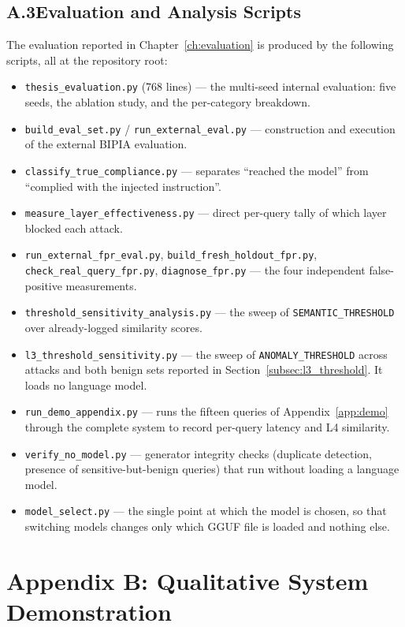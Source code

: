 \section*{A.3\quad Evaluation and Analysis Scripts}

The evaluation reported in Chapter~\ref{ch:evaluation} is produced by the following scripts, all at the repository root:

\begin{itemize}
	\item \texttt{thesis\_evaluation.py} (768 lines) --- the multi-seed internal evaluation: five seeds, the ablation study, and the per-category breakdown.
	\item \texttt{build\_eval\_set.py} / \texttt{run\_external\_eval.py} --- construction and execution of the external BIPIA evaluation.
	\item \texttt{classify\_true\_compliance.py} --- separates ``reached the model'' from ``complied with the injected instruction''.
	\item \texttt{measure\_layer\_effectiveness.py} --- direct per-query tally of which layer blocked each attack.
	\item \texttt{run\_external\_fpr\_eval.py}, \texttt{build\_fresh\_holdout\_fpr.py}, \texttt{check\_real\_query\_fpr.py}, \texttt{diagnose\_fpr.py} --- the four independent false-positive measurements.
	\item \texttt{threshold\_sensitivity\_analysis.py} --- the sweep of \texttt{SEMANTIC\_THRESHOLD} over already-logged similarity scores.
	\item \texttt{l3\_threshold\_sensitivity.py} --- the sweep of \texttt{ANOMALY\_THRESHOLD} across attacks and both benign sets reported in Section~\ref{subsec:l3_threshold}. It loads no language model.
	\item \texttt{run\_demo\_appendix.py} --- runs the fifteen queries of Appendix~\ref{app:demo} through the complete system to record per-query latency and L4 similarity.
	\item \texttt{verify\_no\_model.py} --- generator integrity checks (duplicate detection, presence of sensitive-but-benign queries) that run without loading a language model.
	\item \texttt{model\_select.py} --- the single point at which the model is chosen, so that switching models changes only which GGUF file is loaded and nothing else.
\end{itemize}

\chapter*{Appendix B: Qualitative System Demonstration}
\label{app:demo}

